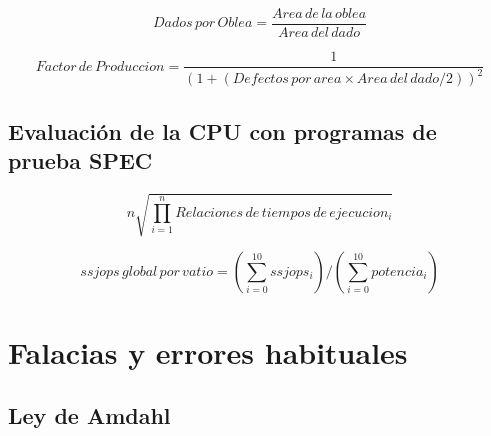 \documentclass[12pt]{article}
\begin{document}
\begin{equation}
    Dados\hspace{2pt}por\hspace{2pt}Oblea = \frac{Area\hspace{2pt}de\hspace{2pt}la\hspace{2pt}oblea}{Area\hspace{2pt}del\hspace{2pt}dado}
\end{equation}


\begin{equation}
    Factor\hspace{2pt}de\hspace{2pt}Produccion = \frac{1}{(1 + (Defectos\hspace{2pt}por\hspace{2pt}area \times Area\hspace{2pt}del\hspace{2pt}dado / 2))^2}
\end{equation}

\subsection*{Evaluación de la CPU con programas de prueba SPEC}    

\begin{equation}
    n \sqrt{\prod_{i=1}^{n} Relaciones\hspace{2pt}de\hspace{2pt}tiempos\hspace{2pt}de\hspace{2pt}ejecucion_i}
\end{equation}

\begin{equation}
    ssjops\hspace{2pt}global\hspace{2pt}por\hspace{2pt}vatio = (\sum_{i = 0}^{10} ssjops_i )/(\sum_{i=0}^{10} potencia_i )
\end{equation}

\section*{Falacias y errores habituales}
\subsection*{Ley de Amdahl}
\end{document}
